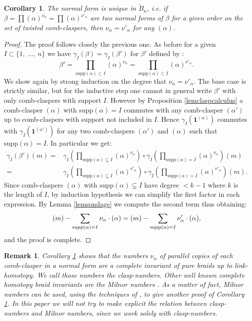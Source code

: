 \documentclass[11pt, a4paper, twoside,reqno]{amsart}
\newtheorem{cor}[thm]{Corollary}
\newtheorem{rmq}[thm]{Remark}
\newcommand\supp{\mathord{\mathrm{supp}}}
\begin{document}
\begin{cor}\label{normalformunicity}
The normal form is unique in $\tilde B_n$, i.e. if $\beta=\prod(\alpha)^{\nu_{\alpha}}=\prod(\alpha)^{\nu'_{\alpha}}$ are two normal forms of $\beta$ for a given order on the set of twisted comb-claspers, then $\nu_{\alpha}=\nu'_{\alpha}$ for any $(\alpha)$.
\end{cor}
\begin{proof}
The proof follows closely the previous one. As before for a given $I\subset\{1,\ \ldots,\ n\}$ we have $\gamma_I(\beta)=\gamma_I(\beta')$ for $\beta'$ defined by :
$$ \beta'=\prod_{\supp(\alpha)\subset I}(\alpha)^{\nu_{\alpha}}=\prod_{\supp(\alpha)\subset I}(\alpha)^{\nu'_{\alpha}}.$$
We show again by strong induction on the degree that $\nu_{\alpha}=\nu'_{\alpha}$. The base case is strictly similar, but for the inductive step one cannot in general write $\beta'$ with only comb-claspers with support $I$. However by Proposition \ref{lemclaspcalculus} a comb-clasper $(\alpha)$ with $\supp(\alpha)= I$ commutes with any comb-clasper $(\alpha')$ up to comb-claspers with support not included in $I$. Hence $\gamma_I(\mathbf1^{(\alpha)})$ commutes with $\gamma_I(\mathbf1^{(\alpha')})$ for any two comb-claspers $(\alpha')$ and $(\alpha)$ such that $\supp(\alpha)= I$. In particular we get:
\begin{align*}
    \gamma_I(\beta')(m)=&\gamma_I\left(\prod_{\supp(\alpha)\subsetneq I}(\alpha)^{\nu_\alpha}\right)\circ\gamma_I\left(\prod_{\supp(\alpha)= I}(\alpha)^{\nu_\alpha}\right)(m)\\
    =&\gamma_I\left(\prod_{\supp(\alpha)\subsetneq I}(\alpha)^{\nu'_\alpha}\right)\circ\gamma_I\left(\prod_{\supp(\alpha)= I}(\alpha)^{\nu'_\alpha}\right)(m).
\end{align*}
Since comb-claspers $(\alpha)$ with $\supp(\alpha)\subsetneq I$ have degree $<k-1$ where $k$ is the length of $I$, by induction hypothesis we can simplify the first factor in each expression. By Lemma \ref{lemsondage} we compute the second term thus obtaining:
$$(m)-\sum_{\supp(\alpha)=I}\nu_\alpha\cdot(\alpha)\\
    =(m)-\sum_{\supp(\alpha)=I}\nu'_\alpha\cdot(\alpha),$$
and the proof is complete.
\end{proof}
\begin{rmq}\label{ccadeaucamfaitplaisir}
Corollary \ref{normalformunicity} shows that the numbers $\nu_{\alpha}$ of parallel copies of each comb-clasper in a normal form are a complete invariant of pure braids up to link-homotopy. We call those numbers the \emph{clasp-numbers}. Other well known complete homotopy braid invariants are the Milnor numbers \cite{HabeggerLinHomotopy}. As a matter of fact, Milnor numbers can be used, using the techniques of \cite{YasuharaAkiraSelfdelteq}, to give another proof of Corollary \ref{normalformunicity}. In this paper we will not try to make explicit the relation between clasp-numbers and Milnor numbers, since we work solely with clasp-numbers. 
\end{rmq} 
\end{document}
